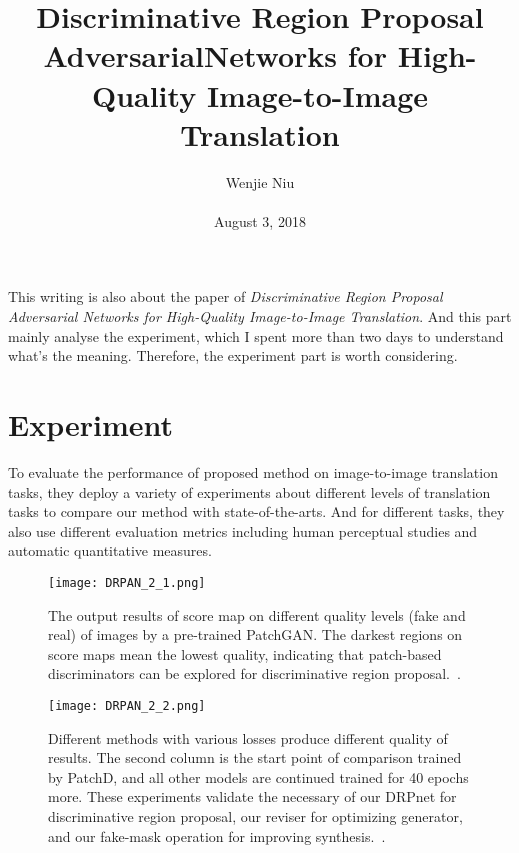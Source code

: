 \documentclass[10pt,twocolumn,letterpaper]{article}
\begin{document}
\title{Discriminative Region Proposal AdversarialNetworks for High-Quality Image-to-Image Translation}

\author{Wenjie Niu\\\\ August 3, 2018}

\maketitle
This writing is also about the paper of \emph{Discriminative Region Proposal Adversarial Networks for High-Quality Image-to-Image Translation}. And this part mainly analyse the experiment, which I spent more than two days to understand what's the meaning. Therefore, the experiment part is worth considering.
\section{Experiment}
To evaluate the performance of proposed method on image-to-image translation tasks, they deploy a variety of experiments about different levels of translation tasks to compare our method with state-of-the-arts. And for different tasks, they also use different evaluation metrics including human perceptual studies and automatic quantitative measures.\par

 \begin{figure*}
 	\begin{center}
 		\texttt{[image: DRPAN\_2\_1.png]}
 	\end{center}
 	\caption{The output results of score map on different quality levels (fake and real) of images by a pre-trained PatchGAN. The darkest regions on score maps mean the lowest quality, indicating that patch-based discriminators can be explored for discriminative region proposal.~\cite{Wang2017Discriminative}.}
 	\label{fig:DRPAN_2_1}
 \end{figure*}
 
  \begin{figure*}
  	\begin{center}
  		\texttt{[image: DRPAN\_2\_2.png]}
  	\end{center}
  	\caption{Different methods with various losses produce different quality of results. The second column is the start point of comparison trained by PatchD, and all other models are continued trained for 40 epochs more. These experiments validate the necessary of our DRPnet for discriminative region proposal, our reviser for optimizing generator, and our fake-mask operation for improving synthesis.~\cite{Wang2017Discriminative}.}
  	\label{fig:DRPAN_2_2}
  \end{figure*}
\end{document}
